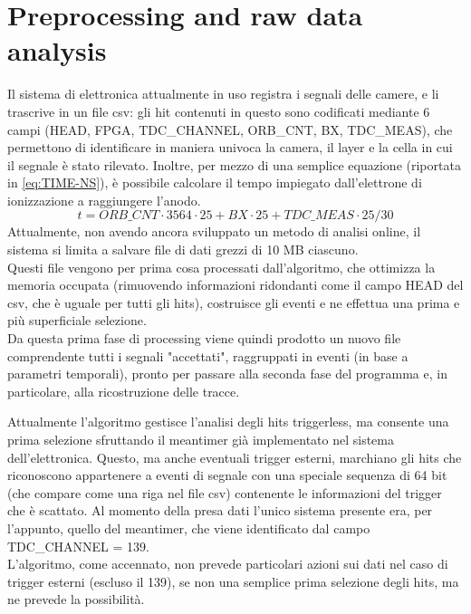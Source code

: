 \documentclass[a4paper,11pt]{book}
\begin{document}

\chapter{Preprocessing and raw data analysis}

Il sistema di elettronica attualmente in uso registra i segnali delle camere, e li trascrive in un file csv: gli hit contenuti in questo sono codificati mediante 6 campi (HEAD, FPGA, TDC\_CHANNEL, ORB\_CNT, BX, TDC\_MEAS), che permettono di identificare in maniera univoca la camera, il layer e la cella in cui il segnale è stato rilevato. Inoltre, per mezzo di una semplice equazione (riportata in \ref{eq:TIME-NS}), è possibile calcolare il tempo impiegato dall'elettrone di ionizzazione a raggiungere l'anodo.
\begin{equation}
t = ORB\_CNT\cdot3564\cdot25+BX\cdot25+TDC\_MEAS\cdot25/30
\label{eq:TIME-NS}
\end{equation}
Attualmente, non avendo ancora sviluppato un metodo di analisi online, il sistema si limita a salvare file di dati grezzi di 10 MB ciascuno.\\
Questi file vengono per prima cosa processati dall'algoritmo, che ottimizza la memoria occupata (rimuovendo informazioni ridondanti come il campo HEAD del csv, che è uguale per tutti gli hits), costruisce gli eventi e ne effettua una prima e più superficiale selezione.\\
Da questa prima fase di processing viene quindi prodotto un nuovo file comprendente tutti i segnali "accettati", raggruppati in eventi (in base a parametri temporali), pronto per passare alla seconda fase del programma e, in particolare, alla ricostruzione delle tracce.\\

\begin{footnotesize}
Attualmente l'algoritmo gestisce l'analisi degli hits triggerless, ma consente una prima selezione sfruttando il meantimer già implementato nel sistema dell'elettronica. Questo, ma anche eventuali trigger esterni, marchiano gli hits che riconoscono appartenere a eventi di segnale con una speciale sequenza di 64 bit (che compare come una riga nel file csv) contenente le informazioni del trigger che è scattato. Al momento della presa dati l'unico sistema presente era, per l'appunto, quello del meantimer, che viene identificato dal campo TDC\_CHANNEL = 139.\\ L'algoritmo, come accennato, non prevede particolari azioni  sui dati nel caso di trigger esterni (escluso il 139), se non una semplice prima selezione degli hits, ma ne prevede la possibilità.\\
\end{footnotesize}
\end{document}
